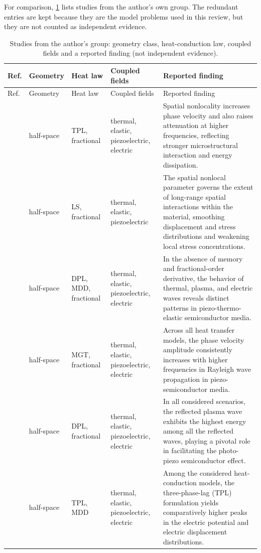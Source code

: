 For comparison, \cref{tab:atlas-own} lists studies from the author's own group. The redundant entries are kept because they are the model problems used in this review, but they are not counted as independent evidence.

{\footnotesize
\begin{longtable}{p{1.9cm}p{2.0cm}p{1.7cm}p{2.6cm}p{5.0cm}}
\caption{Studies from the author's group: geometry class, heat-conduction law, coupled fields and a reported finding (not independent evidence).}\label{tab:atlas-own}\\
\toprule
Ref. & Geometry & Heat law & Coupled fields & Reported finding \\
\midrule
\endfirsthead
\toprule
Ref. & Geometry & Heat law & Coupled fields & Reported finding \\
\midrule
\endhead
\bottomrule
\endfoot
\citet{Aldandani2026} & half-space & TPL, fractional & thermal, elastic, piezoelectric, electric & Spatial nonlocality increases phase velocity and also raises attenuation at higher frequencies, reflecting stronger microstructural interaction and energy dissipation. \\
\citet{Das2026} & half-space & LS, fractional & thermal, elastic, piezoelectric & The spatial nonlocal parameter governs the extent of long-range spatial interactions within the material, smoothing displacement and stress distributions and weakening local stress concentrations. \\
\citet{Gupta2023} & half-space & DPL, MDD, fractional & thermal, elastic, piezoelectric, electric & In the absence of memory and fractional-order derivative, the behavior of thermal, plasma, and electric waves reveals distinct patterns in piezo-thermo-elastic semiconductor media. \\
\citet{Gupta2024} & half-space & MGT, fractional & thermal, elastic, piezoelectric, electric & Across all heat transfer models, the phase velocity amplitude consistently increases with higher frequencies in Rayleigh wave propagation in piezo-semiconductor media. \\
\citet{Gupta2024a} & half-space & DPL, fractional & thermal, elastic, piezoelectric, electric & In all considered scenarios, the reflected plasma wave exhibits the highest energy among all the reflected waves, playing a pivotal role in facilitating the photo-piezo semiconductor effect. \\
\citet{Gupta2026HeatMap} & half-space & TPL, MDD & thermal, elastic, piezoelectric, electric & Among the considered heat-conduction models, the three-phase-lag (TPL) formulation yields comparatively higher peaks in the electric potential and electric displacement distributions. \\

\end{longtable}}
